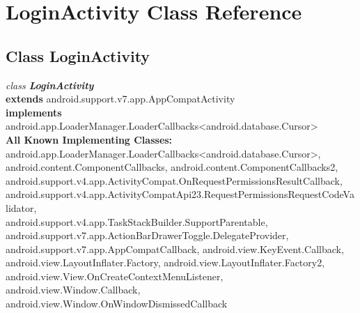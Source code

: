 \hypertarget{class_LoginActivity.Android}{\section{LoginActivity Class Reference}
\label{class_LoginActivity.Android}
}

\subsection*{Class LoginActivity}

\textit{class \textbf{LoginActivity}}\\
\tab \textbf{extends} android.support.v7.app.AppCompatActivity\\
\tab \textbf{implements} android.app.LoaderManager.LoaderCallbacks<android.database.Cursor>\\

\textbf{All Known Implementing Classes:}\\
\tab            android.app.LoaderManager.LoaderCallbacks<android.database.Cursor>,\\ android.content.ComponentCallbacks, android.content.ComponentCallbacks2,\\ android.support.v4.app.ActivityCompat.OnRequestPermissionsResultCallback,\\ android.support.v4.app.ActivityCompatApi23.RequestPermissionsRequestCodeValidator,\\ android.support.v4.app.TaskStackBuilder.SupportParentable,\\ android.support.v7.app.ActionBarDrawerToggle.DelegateProvider,\\ android.support.v7.app.AppCompatCallback, android.view.KeyEvent.Callback,\\ android.view.LayoutInflater.Factory, android.view.LayoutInflater.Factory2,\\ android.view.View.OnCreateContextMenuListener, android.view.Window.Callback,\\ android.view.Window.OnWindowDismissedCallback\\




